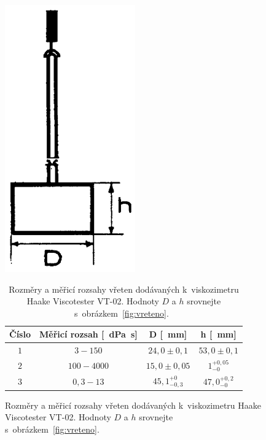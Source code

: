 \documentclass[12pt]{article}
\begin{document}
\begin{figure}[ht]
    \begin{minipage}[b]{0.3\linewidth}
        \centering
        \includegraphics[width=0.5\textwidth]{figures/vreteno.png}
        \caption{Obecný nákres rotačního vřetena.~\cite{man:VT-02}}
        \label{fig:vreteno}
    \end{minipage}
    \hspace{0.5cm}
    \begin{minipage}[b]{0.65\linewidth}
        \begin{table}[H]
            \centering
            \begin{tabular}{|c|c|c|c|}
                \hline
                Číslo & Měřicí rozsah [\SI{}{\deci\pascal\second}] & D [\SI{}{\milli\metre}] & h [\SI{}{\milli\metre}] \\ \hline
                $1$ & $3 - 150$ & $24,0\pm 0,1$ & $53,0\pm0,1$ \\ \hline
                $2$ & $100 - 4000$ & $15,0\pm 0,05$ & $1^{+0,05}_{-0}$ \\ \hline
                $3$ & $0,3 - 13$ & $45,1^{+0}_{-0,3}$ & $47,0^{+0,2}_{-0}$ \\ \hline
            \end{tabular}
            \caption{Rozměry a měřicí rozsahy vřeten dodávaných k~viskozimetru Haake Viscotester VT-02. Hodnoty $D$ a $h$ srovnejte s~obrázkem~\ref{fig:vreteno}.~\cite{man:VT-02}}
            \label{tab:vretena}
        \end{table}
        \label{fig:figure2}
    \end{minipage}
\end{figure}
\end{document}
